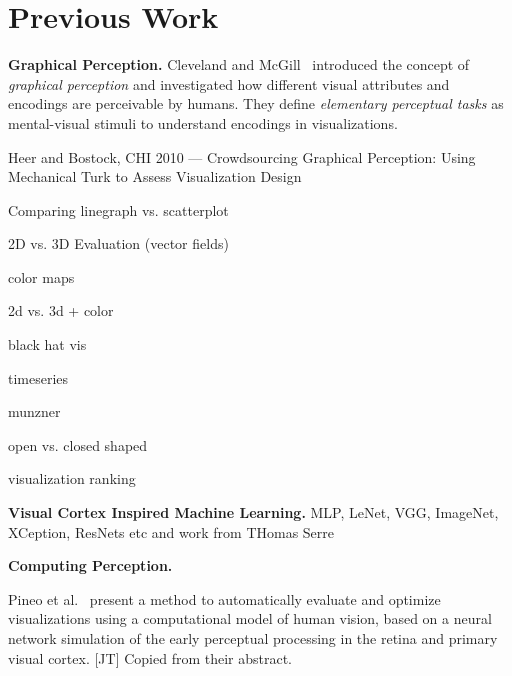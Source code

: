 \section{Previous Work}

\textbf{Graphical Perception.} Cleveland and McGill~\cite{cleveland_mcgill} introduced the concept of \emph{graphical perception} and investigated how different visual attributes and encodings are perceivable by humans. They define \emph{elementary perceptual tasks} as mental-visual stimuli to understand encodings in visualizations. 



\cite{HeerBostock2010} Heer and Bostock, CHI 2010 --- Crowdsourcing Graphical Perception: Using Mechanical Turk to Assess Visualization Design


\cite{Wang_linegraph_vs_scatterplot} Comparing linegraph vs. scatterplot


\cite{mckenzie_2d_3d} \cite{forsberg2009comparing_3d_vector} \cite{laidlaw_2d_vector} 2D vs. 3D Evaluation (vector fields)


\cite{kindlmann2002color} \cite{rheingans1992color} \cite{ware1988color} \cite{Rogowitz2001_colormaps} color maps

2d vs. 3d + color \cite{borkin2011arteries}

black hat vis \cite{heer2017blackhat}

timeseries \cite{herr2009timeseries}

munzner \cite{munzner2015visualization}

open vs. closed shaped \cite{open_vs_closed_shapes}

visualization ranking \cite{harrison2014_webers_law_rank}

\textbf{Visual Cortex Inspired Machine Learning.} MLP, LeNet, VGG, ImageNet, XCeption, ResNets etc and work from THomas Serre
%
%
%
%
%
%
%

\textbf{Computing Perception.}

Pineo et al.~\cite{Pineo2012_computational_perception} present a method to automatically evaluate and optimize visualizations using a computational model of human vision, based on a neural network simulation of the early perceptual processing in the retina and primary visual cortex. [JT] Copied from their abstract.

